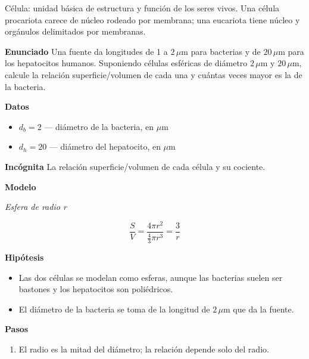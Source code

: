 \documentclass{book}
\begin{document}
\begin{tcolorbox}[title={Definición}, studiumdef, breakable]

Célula: unidad básica de estructura y función de los seres vivos. Una célula procariota carece de núcleo rodeado por membrana; una eucariota tiene núcleo y orgánulos delimitados por membranas.

\end{tcolorbox}

\begin{tcolorbox}[title={Problema resuelto}, studiumworked, breakable]

\noindent\textbf{Enunciado}
Una fuente da longitudes de 1 a \(2\,\mu\mathrm{m}\) para bacterias y de \(20\,\mu\mathrm{m}\) para los hepatocitos humanos. Suponiendo células esféricas de diámetro \(2\,\mu\mathrm{m}\) y \(20\,\mu\mathrm{m}\), calcule la relación superficie/volumen de cada una y cuántas veces mayor es la de la bacteria.


\noindent\textbf{Datos}
\begin{itemize}
\item $d_{b} = 2$ — diámetro de la bacteria, en \(\mu\mathrm{m}\)
\item $d_{h} = 20$ — diámetro del hepatocito, en \(\mu\mathrm{m}\)
\end{itemize}

\noindent\textbf{Incógnita}
La relación superficie/volumen de cada célula y su cociente.


\noindent\textbf{Modelo}

\noindent\textit{Esfera de radio r}

\[
\frac{S}{V} = \frac{4\pi r^{2}}{\frac{4}{3}\pi r^{3}} = \frac{3}{r}
\]

\noindent\textbf{Hipótesis}
\begin{itemize}
\item Las dos células se modelan como esferas, aunque las bacterias suelen ser bastones y los hepatocitos son poliédricos.
\item El diámetro de la bacteria se toma de la longitud de \(2\,\mu\mathrm{m}\) que da la fuente.
\end{itemize}

\noindent\textbf{Pasos}
\begin{enumerate}
\item
El radio es la mitad del diámetro; la relación depende solo del radio.


\end{enumerate}
\end{tcolorbox}
\end{document}
